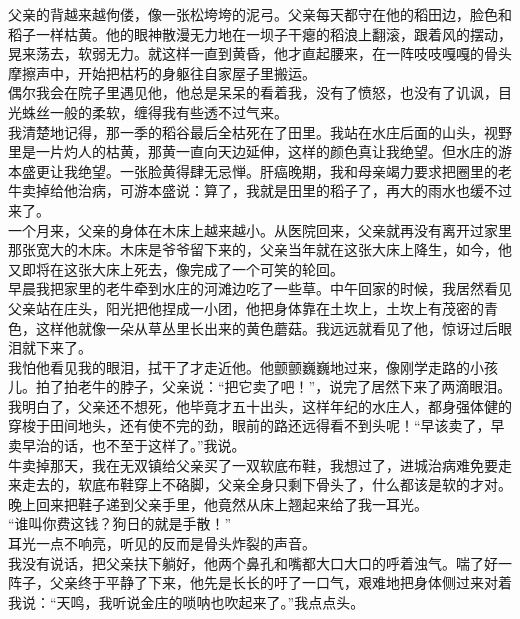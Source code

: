 父亲的背越来越佝偻，像一张松垮垮的泥弓。父亲每天都守在他的稻田边，脸色和稻子一样枯黄。他的眼神散漫无力地在一坝子干瘪的稻浪上翻滚，跟着风的摆动，晃来荡去，软弱无力。就这样一直到黄昏，他才直起腰来，在一阵吱吱嘎嘎的骨头摩擦声中，开始把枯朽的身躯往自家屋子里搬运。\\

偶尔我会在院子里遇见他，他总是呆呆的看着我，没有了愤怒，也没有了讥讽，目光蛛丝一般的柔软，缠得我有些透不过气来。\\

我清楚地记得，那一季的稻谷最后全枯死在了田里。我站在水庄后面的山头，视野里是一片灼人的枯黄，那黄一直向天边延伸，这样的颜色真让我绝望。但水庄的游本盛更让我绝望。一张脸黄得肆无忌惮。肝癌晚期，我和母亲竭力要求把圈里的老牛卖掉给他治病，可游本盛说：算了，我就是田里的稻子了，再大的雨水也缓不过来了。\\

一个月来，父亲的身体在木床上越来越小。从医院回来，父亲就再没有离开过家里那张宽大的木床。木床是爷爷留下来的，父亲当年就在这张大床上降生，如今，他又即将在这张大床上死去，像完成了一个可笑的轮回。\\

早晨我把家里的老牛牵到水庄的河滩边吃了一些草。中午回家的时候，我居然看见父亲站在庄头，阳光把他捏成一小团，他把身体靠在土坎上，土坎上有茂密的青色，这样他就像一朵从草丛里长出来的黄色蘑菇。我远远就看见了他，惊讶过后眼泪就下来了。\\

我怕他看见我的眼泪，拭干了才走近他。他颤颤巍巍地过来，像刚学走路的小孩儿。拍了拍老牛的脖子，父亲说：“把它卖了吧！”，说完了居然下来了两滴眼泪。我明白了，父亲还不想死，他毕竟才五十出头，这样年纪的水庄人，都身强体健的穿梭于田间地头，还有使不完的劲，眼前的路还远得看不到头呢！“早该卖了，早卖早治的话，也不至于这样了。”我说。\\

牛卖掉那天，我在无双镇给父亲买了一双软底布鞋，我想过了，进城治病难免要走来走去的，软底布鞋穿上不硌脚，父亲全身只剩下骨头了，什么都该是软的才对。\\

晚上回来把鞋子递到父亲手里，他竟然从床上翘起来给了我一耳光。\\

“谁叫你费这钱？狗日的就是手散！”\\

耳光一点不响亮，听见的反而是骨头炸裂的声音。\\

我没有说话，把父亲扶下躺好，他两个鼻孔和嘴都大口大口的呼着浊气。喘了好一阵子，父亲终于平静了下来，他先是长长的吁了一口气，艰难地把身体侧过来对着我说：“天鸣，我听说金庄的唢呐也吹起来了。”我点点头。\\

